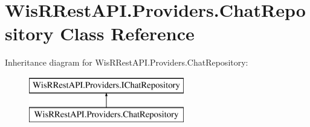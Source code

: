 \hypertarget{class_wis_r_rest_a_p_i_1_1_providers_1_1_chat_repository}{}\section{Wis\+R\+Rest\+A\+P\+I.\+Providers.\+Chat\+Repository Class Reference}
\label{class_wis_r_rest_a_p_i_1_1_providers_1_1_chat_repository}
Inheritance diagram for Wis\+R\+Rest\+A\+P\+I.\+Providers.\+Chat\+Repository\+:\begin{figure}[H]
\begin{center}
\leavevmode
\includegraphics[height=2.000000cm]{class_wis_r_rest_a_p_i_1_1_providers_1_1_chat_repository}
\end{center}
\end{figure}
